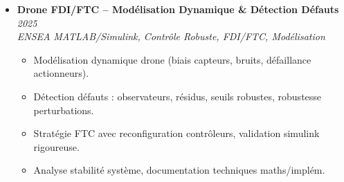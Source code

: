 \documentclass[a4paper,11pt]{article}
\begin{document}
\begin{itemize}[leftmargin=*, label={-}]
    \textit{ENSEA} \hfill \textit{C, IPC, SHM, Signaux, OpenGL, Linux, Architecture}
    \vspace{-2pt}
        \begin{itemize}[leftmargin=0.4cm, nosep, label=\tiny$\bullet$]
            \item \small{Simulation flotte taxis multiprocessus, communication inter-processus (pipes, sockets).}
            \item \small{Gestion m\'emoire partag\'ee (SHM), synchronisation processus (semaphores, signaux).}
            \item \small{Ordonnanceur FIFO, visualisation OpenGL, architecture robuste processus.}
            \item \small{Test stabilité syst\`eme, optimisation performance, documentation architecture compl\`ete.}
        \end{itemize}
    \vspace{3pt}
    \item \textbf{Drone FDI/FTC -- Mod\'elisation Dynamique \& D\'etection Défauts} \hfill \textit{2025} \\
    \textit{ENSEA} \hfill \textit{MATLAB/Simulink, Contr\^ole Robuste, FDI/FTC, Mod\'elisation}
    \vspace{-2pt}
        \begin{itemize}[leftmargin=0.4cm, nosep, label=\tiny$\bullet$]
            \item \small{Modélisation dynamique drone (biais capteurs, bruits, d\'efaillance actionneurs).}
            \item \small{D\'etection défauts : observateurs, r\'esidus, seuils robustes, robustesse perturbations.}
            \item \small{Strat\'egie FTC avec reconfiguration contr\^oleurs, validation simulink rigoureuse.}
            \item \small{Analyse stabilit\'e syst\`eme, documentation techniques maths/implém.}
        \end{itemize}
\end{itemize}
\end{document}
